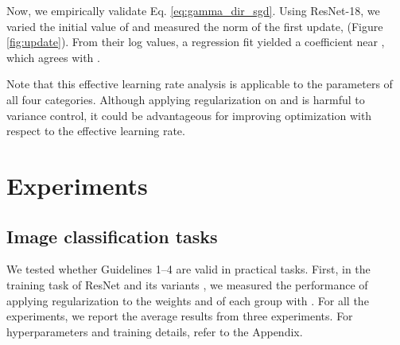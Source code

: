 \documentclass{article}
\begin{document}
Now, we empirically validate Eq. \ref{eq:gamma_dir_sgd}. Using ResNet-18, we varied the initial value of  and measured the norm of the first update,  (Figure \ref{fig:update}). From their log values, a regression fit yielded a coefficient near , which agrees with .

Note that this effective learning rate analysis is applicable to the  parameters of all four categories. Although applying  regularization on  and  is harmful to variance control, it could be advantageous for improving optimization with respect to the effective learning rate.

\section{Experiments}
\label{sec:experiments}

\subsection{Image classification tasks}
We tested whether Guidelines 1--4 are valid in practical tasks. First, in the training task of ResNet and its variants \cite{gcvpr/HeZRS16,geccv/HeZRS16,gbmvc/ZagoruykoK16,gcvpr/XieGDTH17}, we measured the performance of applying  regularization to the weights and  of each group with . For all the experiments, we report the average results from three experiments. For hyperparameters and training details, refer to the Appendix.
\end{document}
